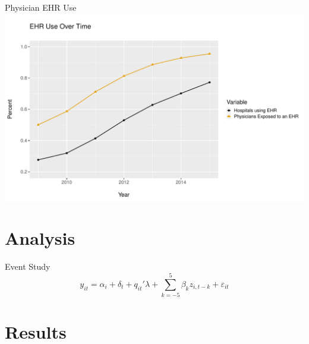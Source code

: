 \documentclass[10pt]{beamer}
\begin{document}
\begin{frame}{Physician EHR Use}
    \centering
    \includegraphics[scale=.5]{Objects/sum_stats_year.pdf}
\end{frame}


\section{Analysis}

\begin{frame}{Event Study}
\begin{equation*}
    y_{it}=\alpha_i+\delta_t+q_{it}'\lambda+\sum_{k=-5}^5 \beta_kz_{i,t-k} + \varepsilon_{it}
\end{equation*}

    
\end{frame}

\section{Results}
\end{document}
